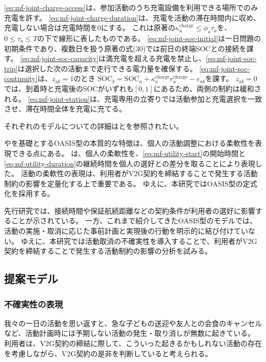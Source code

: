 \eqref{eq:mf-joint-charge-access}は、参加活動のうち充電設備を利用できる場所でのみ充電を許す。
\eqref{eq:mf-joint-charge-duration}は、充電を活動の滞在時間内に収め、充電しない場合は充電時間を0にする。
これは原著の$\kappa_a^{\mathrm{charge}}\le\phi_a\tau_a$を、$0\le\tau_a\le T$の下で線形に表したものである。
\eqref{eq:mf-joint-soc-initial}は一日問題の初期条件であり、複数日を扱う原著の式(30)では前日の終端SOCとの接続を課す。
\eqref{eq:mf-joint-soc-capacity}は満充電を超える充電を禁止し、\eqref{eq:mf-joint-soc-trip}は選択した次の活動まで走行できる電力量を確保する。
\eqref{eq:mf-joint-soc-continuity}は、$z_{ab}=1$のとき
$\mathrm{SOC}_b=\mathrm{SOC}_a+\kappa_a^{\mathrm{charge}}r_a^{\mathrm{charge}}-e_{ab}$を課す。
$z_{ab}=0$では、到着時と充電後のSOCがいずれも$[0,1]$にあるため、両側の制約は緩和される。
\eqref{eq:mf-joint-station}は、充電専用の立寄りでは活動参加と充電選択を一致させ、滞在時間全体を充電に充てる。

それぞれのモデルについての詳細は\citet{pougala2023oasis}と\citet{wang2025joint}を参照されたい。

\citet{pougala2023oasis}や\citet{wang2025joint}を基礎とするOASIS型の本質的な特徴は、個人の活動調整における柔軟性を表現できる点にある。
\citet{pougala2023oasis}は、個人の柔軟性を、\eqref{eq:mf-utility-start}の開始時間と\eqref{eq:mf-utility-duration}の継続時間を個人の選好との差分を取ることにより表現した。
活動の柔軟性の表現は、利用者がV2G契約を締結することで発生する活動制約の影響を定量化する上で重要である。
ゆえに、本研究ではOASIS型の定式化を採用する。

先行研究では、接続時間や保証航続距離などの契約条件が利用者の選好に影響することが示されている\citep{parsons2014willingness}。
一方、これまで紹介してきたOASIS型のモデルでは、活動の実施・取消に応じた事前計画と実現後の行動を明示的に結び付けていない。
ゆえに、本研究では活動取消の不確実性を導入することで、利用者がV2G契約を締結することで発生する活動制約の影響の分析を試みる。


\subsection{提案モデル}
\label{subsec:stochastic_extension}

\subsubsection{不確実性の表現}

我々の一日の活動を思い返すと、急な子どもの送迎や友人との会食のキャンセルなど、活動計画時には予期しない活動の発生・取り消しが無数に起きている。
利用者は、V2G契約の締結に際して、こういった起きるかもしれない活動の存在を考慮しながら、V2G契約の是非を判断していると考えられる。

